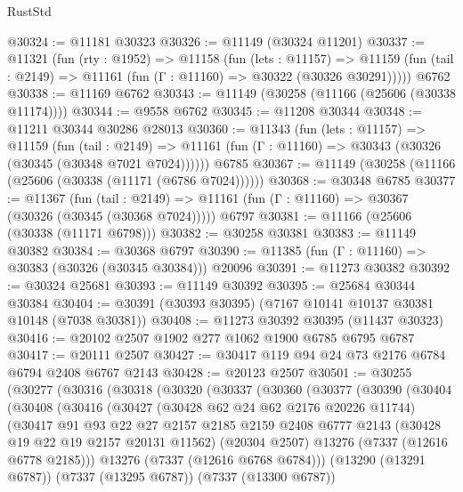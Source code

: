 \begin{lexlean}{RustStd}
\begin{coremodule}
@30324 := @11181 @30323
@30326 := @11149 (@30324 @11201)
@30337 := @11321
    (fun (rty : @1952) =>
    @11158
      (fun (lets : @11157) =>
      @11159 (fun (tail : @2149) => @11161 (fun (Γ : @11160) => @30322 (@30326 @30291)))))
    @6762
@30338 := @11169 @6762
@30343 := @11149 (@30258 (@11166 (@25606 (@30338 @11174))))
@30344 := @9558 @6762
@30345 := @11208 @30344
@30348 := @11211 @30344 @30286 @28013
@30360 := @11343
    (fun (lets : @11157) =>
    @11159
      (fun (tail : @2149) =>
      @11161 (fun (Γ : @11160) => @30343 (@30326 (@30345 (@30348 @7021 @7024))))))
    @6785
@30367 := @11149 (@30258 (@11166 (@25606 (@30338 (@11171 (@6786 @7024))))))
@30368 := @30348 @6785
@30377 := @11367
    (fun (tail : @2149) => @11161 (fun (Γ : @11160) => @30367 (@30326 (@30345 (@30368 @7024)))))
    @6797
@30381 := @11166 (@25606 (@30338 (@11171 @6798)))
@30382 := @30258 @30381
@30383 := @11149 @30382
@30384 := @30368 @6797
@30390 := @11385 (fun (Γ : @11160) => @30383 (@30326 (@30345 @30384))) @20096
@30391 := @11273 @30382
@30392 := @30324 @25681
@30393 := @11149 @30392
@30395 := @25684 @30344 @30384
@30404 := @30391 (@30393 @30395) (@7167 @10141 @10137 @30381 @10148 (@7038 @30381))
@30408 := @11273 @30392 @30395 (@11437 @30323)
@30416 := @20102 @2507 @1902 @277 @1062 @1900 @6785 @6795 @6787
@30417 := @20111 @2507
@30427 := @30417 @119 @94 @24 @73 @2176 @6784 @6794 @2408 @6767 @2143
@30428 := @20123 @2507
@30501 := @30255
    (@30277
      (@30316
        (@30318
          (@30320
            (@30337
              (@30360
                (@30377
                  (@30390
                    (@30404
                      (@30408
                        (@30416
                          (@30427
                            (@30428 @62 @24 @62 @2176 @20226 @11744)
                            (@30417
                              @91
                              @93
                              @22
                              @27
                              @2157
                              @2185
                              @2159
                              @2408
                              @6777
                              @2143
                              (@30428 @19 @22 @19 @2157 @20131 @11562)
                              (@20304 @2507)
                              @13276
                              (@7337 (@12616 @6778 @2185)))
                            @13276
                            (@7337 (@12616 @6768 @6784)))
                          (@13290 (@13291 @6787))
                          (@7337 (@13295 @6787))
                          (@7337 (@13300 @6787))

\end{coremodule}
\end{lexlean}
